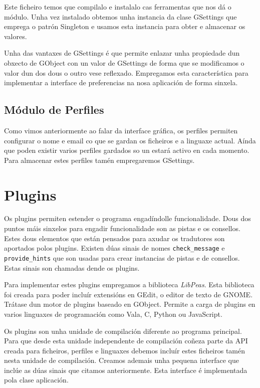 Este ficheiro temos que compilalo e instalalo cas ferramentas que nos dá o módulo. Unha vez instalado obtemos unha instancia da clase GSettings que emprega o patrón Singleton e usamos esta instancia para obter e almacenar os valores.

Unha das vantaxes de GSettings é que permite enlazar unha propiedade dun obxecto de GObject con un valor de GSettings de forma que se modificamos o valor dun dos dous o outro vese reflexado. Empregamos esta característica para implementar a interface de preferencias na nosa aplicación de forma sinxela.

\subsection{Módulo de Perfiles}
Como vimos anteriormente ao falar da interface gráfica, os perfiles permiten configurar o nome e email co que se gardan os ficheiros e a linguaxe actual. Aínda que poden existir varios perfiles gardados so un estará activo en cada momento. Para almacenar estes perfiles tamén empregaremos GSettings.

\section{Plugins}
Os plugins permiten estender o programa engadíndolle funcionalidade. Dous dos puntos máis sinxelos para engadir funcionalidade son as pistas e os consellos. Estes dous elementos que están pensados para axudar os tradutores son aportados polos plugins. Existen dúas sinais de nomes \lstinline{check_message} e \lstinline{provide_hints} que son usadas para crear instancias de pistas e de consellos. Estas sinais son chamadas dende os plugins.

Para implementar estes plugins empregamos a biblioteca \emph{LibPeas}. Esta biblioteca foi creada para poder incluír extensións en GEdit, o editor de texto de GNOME. Trátase dun motor de plugins baseado en GObject. Permite a carga de plugins en varios linguaxes de programación como Vala, C, Python ou JavaScript.

Os plugins son unha unidade de compilación diferente ao programa principal. Para que desde esta unidade independente de compilación coñeza parte da API creada para ficheiros, perfiles e linguaxes debemos incluír estes ficheiros tamén nesta unidade de compilación. Creamos ademais unha pequena interface que inclúe as dúas sinais que citamos anteriormente. Esta interface é implementada pola clase aplicación.

